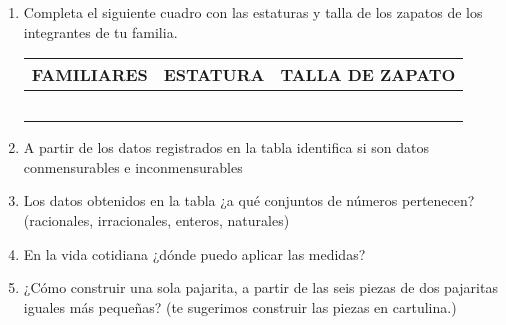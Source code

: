 \documentclass[12pt,a4paper]{article}
\begin{document}
\begin{enumerate}
\item Completa el siguiente cuadro con las estaturas y talla de los zapatos de los integrantes de tu familia.

\vspace{0.5cm}

\begin{center}
\renewcommand{\arraystretch}{1.4}
\setlength{\extrarowheight}{3pt}
\begin{tabular}{|p{}|p{}|p{}|}
\hline
\textbf{FAMILIARES} & \textbf{ESTATURA} & \textbf{TALLA DE ZAPATO} \\
\hline
 & & \\[1cm]
\hline
 & & \\[1cm]
\hline
 & & \\[1cm]
\hline
 & & \\[1cm]
\hline
 & & \\[1cm]
\hline
\end{tabular}
\renewcommand{\arraystretch}{1}
\setlength{\extrarowheight}{0pt}
\end{center}

\vspace{0.5cm}

\item A partir de los datos registrados en la tabla identifica si son datos conmensurables e inconmensurables

\item Los datos obtenidos en la tabla ¿a qué conjuntos de números pertenecen? (racionales, irracionales, enteros, naturales)

\item En la vida cotidiana ¿dónde puedo aplicar las medidas?

\item ¿Cómo construir una sola pajarita, a partir de las seis piezas de dos pajaritas iguales más pequeñas? (te sugerimos construir las piezas en cartulina.)

\end{enumerate}

\vspace{0.5cm}

\end{document}
